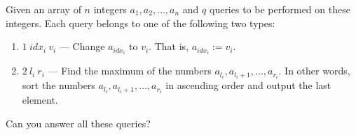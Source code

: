 Given an array of $n$ integers $a_1,a_2,\ldots,a_n$ and $q$ queries to be performed on these integers. Each query belongs to one of the following two types:
\begin{enumerate}
    \item $1\ idx_i\ v_i$ — Change $a_{idx_i}$ to $v_i$. That is, $a_{idx_i} := v_i$.
    \item $2\ l_i\ r_i$ — Find the maximum of the numbers $a_{l_i},a_{l_i+1},\ldots,a_{r_i}$.
    In other words, sort the numbers $a_{l_i},a_{l_i+1},\ldots,a_{r_i}$ in ascending order and output the last element.
\end{enumerate}
Can you answer all these queries?